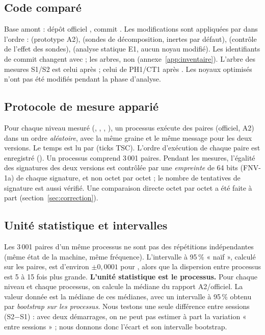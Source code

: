 \subsection{Code comparé}
Base amont : dépôt officiel , commit . Les modifications sont appliquées par  dans l'ordre :  (prototype A2),  (sondes de décomposition, inertes par défaut),  (contrôle de l'effet des sondes),  (analyse statique E1, aucun noyau modifié). Les identifiants de commit changent avec  ; les arbres, non (annexe~\ref{app:inventaire}). L'arbre des mesures S1/S2 est celui après  ; celui de PH1/CT1 après . Les noyaux optimisés n'ont pas été modifiés pendant la phase d'analyse.

\subsection{Protocole de mesure apparié}
Pour chaque niveau mesuré (, , , ), un processus exécute des paires (officiel, A2) dans un ordre \emph{aléatoire}, avec la même graine et le même message pour les deux versions. Le temps est lu par  (ticks TSC). L'ordre d'exécution de chaque paire est enregistré (). Un processus comprend 3\,001 paires. Pendant les mesures, l'égalité des signatures des deux versions est contrôlée par une \emph{empreinte} de 64 bits (FNV-1a) de chaque signature, et non octet par octet ; le nombre de tentatives de signature est aussi vérifié. Une comparaison directe octet par octet a été faite à part (section~\ref{sec:correction}).

\subsection{Unité statistique et intervalles}
Les 3\,001 paires d'un même processus ne sont pas des répétitions indépendantes (même état de la machine, même fréquence). L'intervalle à 95\,\% « naïf », calculé sur les paires, est d'environ $\pm0{,}0001$ pour , alors que la dispersion entre processus est 5 à 15 fois plus grande. \textbf{L'unité statistique est le processus.} Pour chaque niveau et chaque processus, on calcule la médiane du rapport A2/officiel. La valeur donnée est la médiane de ces médianes, avec un intervalle à 95\,\% obtenu par \emph{bootstrap sur les processus}. Nous testons une seule différence entre sessions (S2$-$S1) : avec deux démarrages, on ne peut pas estimer à part la variation « entre sessions » ; nous donnons donc l'écart et son intervalle bootstrap.

